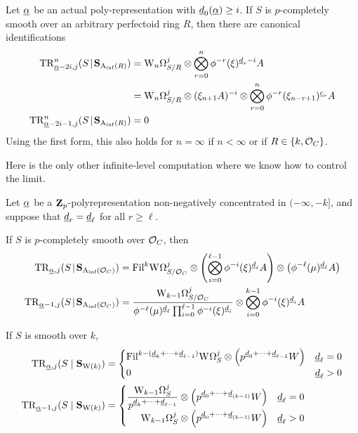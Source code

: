 \begin{corollary}
  Let $\m\alpha$ be an actual poly-representation with $\m d_0(\m\alpha)\ge i$. If $S$ is $p$-completely smooth over an arbitrary perfectoid ring $R$, then there are canonical identifications
  \begin{align*}
    \TR^n_{\m\alpha-2i,j}(S\rel\SAinf{R})
      &= \dRW[n]^j_{S/R} \tnsr \bigotimes_{r=0}^n \phi^{-r}(\xi)^{\m d_r-i}A\\
      &= \dRW[n]^j_{S/R} \tnsr (\xi_{n+1} A)^{-i } \tnsr \bigotimes_{r=0}^n\phi^{-r}(\xi_{n-r+1})^{\m c_r}A\\
      \TR^n_{\m\alpha-2i-1,j}(S\rel\SAinf{R})
      &= 0
  \end{align*}
  Using the first form, this also holds for $n=\infty$ if $n<\infty$ or if $R\in\{k,\O_C\}$.
\end{corollary}

Here is the only other infinite-level computation where we know how to control the limit.

\begin{corollary}
  Let $\m\alpha$ be a $\Z_p$-polyrepresentation non-negatively concentrated in $(-\infty,-k]$, and suppose that $\m d_r=\m d_\ell$ for all $r\ge\ell$.

  If $S$ is $p$-completely smooth over $\O_C$, then
  \begin{align*}
    \TR_{\m\alpha,j}(S\rel\SAinf{\O_C})
      &= \Fil^k \dRW^j_{S/\O_C} \tnsr \left(\bigotimes_{i=0}^{\ell-1} \phi^{-i}(\xi)^{\m d_i}A\right) \tnsr \left(\phi^{-\ell}(\mu)^{\m d_\ell}A\right)\\
      \TR_{\m\alpha-1,j}(S\rel\SAinf{\O_C})
      &= \frac{\dRW[k-1]^j_{S/\O_C}}{\phi^{-\ell}(\mu)^{\m d_\ell}\prod_{i=0}^{\ell-1}\phi^{-i}(\xi)^{\m d_i}} \tnsr\bigotimes_{i=0}^{k-1} \phi^{-i}(\xi)^{\m d_i}A
  \end{align*}

  If $S$ is smooth over $k$,
  \begin{align*}
    \TR_{\m\alpha,j}(S\mid\SW k)
      &= \begin{cases}
        \Fil^{k-(\m d_k+\dotsb+\m d_{\ell-1})} \dRW^j_S\tnsr \left(p^{\m d_0 + \dotsb + \m d_{\ell-1}}W\right) & \m d_\ell = 0\\
        0 & \m d_\ell > 0
      \end{cases}\\
    \TR_{\m\alpha-1,j}(S\mid\SW k)
      &= \left\{\!\!\!
        \begin{array}{r@{}ll}
          \dfrac{\dRW[k-1]^j_S}{p^{\m d_k+\dotsb + \m d_{\ell-1}}} &{}\tnsr \left(p^{\m d_0 + \dotsb + \m d_{(k-1)}}W\right) & \m d_\ell = 0\\
          \dRW[k-1]^j_S &{}\tnsr \left(p^{\m d_0 + \dotsb + \m d_{(k-1)}}W\right) & \m d_\ell >0
        \end{array}
        \right.
  \end{align*}
\end{corollary}

